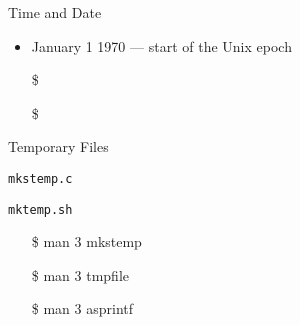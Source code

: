
\begin{frame}{Time and Date}
  \begin{center}
  \end{center}
  \begin{itemize}
  \item January 1 1970 --- start of the Unix epoch
  \item[\$] 
  \item[\$] 
  \end{itemize}
\end{frame}

\begin{frame}{Temporary Files}
  \begin{minipage}[t]{.55\linewidth}
    \begin{iblock}{\texttt{mkstemp.c}}
    \end{iblock}
  \end{minipage}\qquad
  \begin{minipage}[t]{.35\linewidth}
    \begin{iblock}{\texttt{mktemp.sh}}
    \end{iblock}
    \ttfamily
    \begin{itemize}
    \item[\$] man 3 mkstemp
    \item[\$] man 3 tmpfile
    \item[\$] man 3 asprintf
    \end{itemize}
  \end{minipage}
\end{frame}

